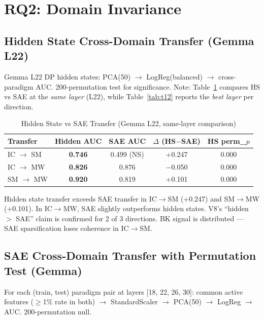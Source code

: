 \documentclass[11pt,a4paper]{article}
\begin{document}
\section{RQ2: Domain Invariance}

\subsection{Hidden State Cross-Domain Transfer (Gemma L22)}

Gemma L22 DP hidden states: PCA(50) $\rightarrow$ LogReg(balanced) $\rightarrow$ cross-paradigm AUC. 200-permutation test for significance. Note: Table~\ref{tab:t11} compares HS vs SAE at the \emph{same layer} (L22), while Table~\ref{tab:t12} reports the \emph{best layer} per direction.

\begin{table}[H]
\centering
\caption{Hidden State vs SAE Transfer (Gemma L22, same-layer comparison)}\label{tab:t11}
\footnotesize
\begin{tabular}{lcccc}
\toprule
Transfer & Hidden AUC & SAE AUC & $\Delta$ (HS$-$SAE) & HS perm\_$p$ \\
\midrule
IC $\rightarrow$ SM & \textbf{0.746} & 0.499 (NS) & +0.247 & 0.000 \\
IC $\rightarrow$ MW & \textbf{0.826} & 0.876 & $-$0.050 & 0.000 \\
SM $\rightarrow$ MW & \textbf{0.920} & 0.819 & +0.101 & 0.000 \\
\bottomrule
\end{tabular}
\end{table}

\noindent Hidden state transfer exceeds SAE transfer in IC$\rightarrow$SM (+0.247) and SM$\rightarrow$MW (+0.101). In IC$\rightarrow$MW, SAE slightly outperforms hidden states. V8's ``hidden $>$ SAE'' claim is confirmed for 2 of 3 directions. BK signal is distributed --- SAE sparsification loses coherence in IC$\rightarrow$SM.

\subsection{SAE Cross-Domain Transfer with Permutation Test (Gemma)}

For each (train, test) paradigm pair at layers [18, 22, 26, 30]: common active features ($\ge$1\% rate in both) $\rightarrow$ StandardScaler $\rightarrow$ PCA(50) $\rightarrow$ LogReg $\rightarrow$ AUC. 200-permutation null.
\end{document}

